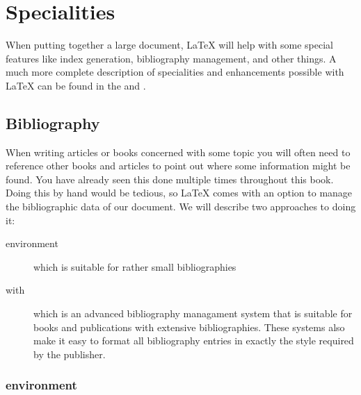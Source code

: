 
\chapter{Specialities}
\begin{intro}
  When putting together a large document, \LaTeX{} will help
  with some special features like index generation,
  bibliography management, and other things.
  A much more complete description of specialities and
  enhancements possible with \LaTeX{} can be found in the
  {\normalfont\manual{}} and {\normalfont \companion}.
\end{intro}


\section{Bibliography}

When writing articles or books concerned with some topic you will often need to
reference other books and articles to point out where some information might be
found. You have already seen this done multiple times throughout this book.
Doing this by hand would be tedious, so \LaTeX{} comes with an option to manage
the bibliographic data of our document. We will describe two approaches to
doing it:
\begin{description}
  \item[ environment] which is suitable for rather small
  bibliographies
  \item[ with ] which is an advanced bibliography
  managament system that is suitable for books and publications with extensive bibliographies. These systems also make it easy to format all bibliography entries in exactly the style required by the publisher.
\end{description}

\subsection{ environment}

